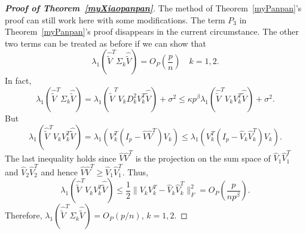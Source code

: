 \begin{proof}[\textbf{Proof of Theorem~\ref{myXiaopanpan}}]
    The method of Theorem~\ref{myPanpan}'s proof can still work here with some modifications.
    The term $P_3$ in Theorem~\ref{myPanpan}'s proof disappears in the current circumstance.
    The other two terms can be treated as before if we can show that
    $$
    \lambda_1(\hat{\tilde{V}}^T \Sigma_k \hat{\tilde{V}}) =O_P(\frac{p}{n})\quad k=1,2.
    $$
    In fact,
    $$
    \lambda_1(\hat{\tilde{V}}^T \Sigma_k \hat{\tilde{V}})
    =
    \lambda_1(\hat{\tilde{V}}^T V_k D^2_k V_k^T \hat{\tilde{V}}) + \sigma^2
    \leq
    \kappa p^{\beta}\lambda_1(\hat{\tilde{V}}^T V_k V_k^T \hat{\tilde{V}}) +\sigma^2.
    $$
    But
    $$
    \lambda_1(\hat{\tilde{V}}^T V_k V_k^T \hat{\tilde{V}})
    =
    \lambda_1( V_k^T(I_p- \hat{V}\hat{V}^T) V_k)
    \leq
    \lambda_1( V_k^T(I_p- \hat{V}_k\hat{V}_k^T) V_k).
    $$
    The last inequality holds since $\hat{V}\hat{V}^T$ is the projection on the sum space of $\hat{V}_1\hat{V}_1^T$ and $\hat{V}_2\hat{V}_2^T$ and hence $\hat{V}\hat{V}^T\geq \hat{V}_1\hat{V}_1^T$.
    Thus,
    $$
    \lambda_1(\hat{\tilde{V}}^T V_k V_k^T \hat{\tilde{V}})
    \leq \frac{1}{2}\|V_k V_k^T - \hat{V}_k\hat{V}_k^T\|^2_F=O_P(\frac{p}{np^{\beta}}).
    $$
    Therefore,
    $
    \lambda_1(\hat{\tilde{V}}^T \Sigma_k \hat{\tilde{V}})
    =O_P({p}/{n})$, $k=1,2$.
\end{proof}
